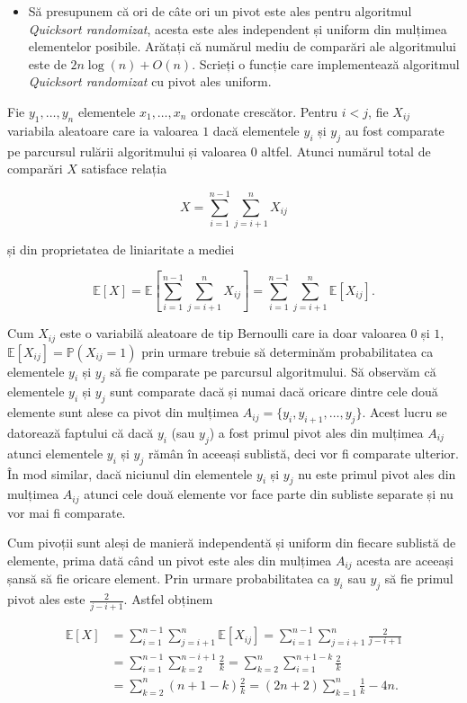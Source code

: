 \documentclass[]{article}
\newenvironment{frshaded*}{%
  \def\FrameCommand{\fboxrule=\FrameRule\fboxsep=\FrameSep \fcolorbox{framecolor}{shadecolor1}}%
  \MakeFramed {\advance\hsize-\width \FrameRestore}}%
{\endMakeFramed}
\newenvironment{rmdblock}[1]
  {\begin{frshaded*}
  \begin{itemize}
  \renewcommand{\labelitemi}{
    \raisebox{-.7\height}[0pt][0pt]{
      {\setkeys{Gin}{width=2em,keepaspectratio}\texttt{[image: images/icons/\#1]}}
    }
  }
  \item
  }
  {
  \end{itemize}
  \end{frshaded*}
  }
\newenvironment{rmdexercise}
  {\begin{rmdblock}{exercise}}
  {\end{rmdblock}}
\begin{document}
\begin{rmdexercise}
Să presupunem că ori de câte ori un pivot este ales pentru algoritmul
\emph{Quicksort randomizat}, acesta este ales independent și uniform din
mulțimea elementelor posibile. Arătați că numărul mediu de comparări ale
algoritmului este de \(2n\log(n)+O(n)\). Scrieți o funcție care
implementează algoritmul \emph{Quicksort randomizat} cu pivot ales
uniform.
\end{rmdexercise}

Fie \(y_1,\ldots, y_n\) elementele \(x_1,\ldots, x_n\) ordonate
crescător. Pentru \(i<j\), fie \(X_{ij}\) variabila aleatoare care ia
valoarea \(1\) dacă elementele \(y_i\) și \(y_j\) au fost comparate pe
parcursul rulării algoritmului și valoarea \(0\) altfel. Atunci numărul
total de comparări \(X\) satisface relația

\[
  X = \sum_{i = 1}^{n-1}\sum_{j = i+1}^{n}X_{ij}
\]

și din proprietatea de liniaritate a mediei

\[
  \mathbb{E}[X] = \mathbb{E}\left[\sum_{i = 1}^{n-1}\sum_{j = i+1}^{n}X_{ij}\right] = \sum_{i = 1}^{n-1}\sum_{j = i+1}^{n}\mathbb{E}[X_{ij}].
\]

Cum \(X_{ij}\) este o variabilă aleatoare de tip Bernoulli care ia doar
valoarea \(0\) și \(1\), \(\mathbb{E}[X_{ij}]=\mathbb{P}(X_{ij}=1)\)
prin urmare trebuie să determinăm probabilitatea ca elementele \(y_i\)
și \(y_j\) să fie comparate pe parcursul algoritmului. Să observăm că
elementele \(y_i\) și \(y_j\) sunt comparate dacă și numai dacă oricare
dintre cele două elemente sunt alese ca pivot din mulțimea
\(A_{ij} = \{y_i,y_{i+1},\ldots, y_j\}\). Acest lucru se datorează
faptului că dacă \(y_i\) (sau \(y_j\)) a fost primul pivot ales din
mulțimea \(A_{ij}\) atunci elementele \(y_i\) și \(y_j\) rămân în
aceeași sublistă, deci vor fi comparate ulterior. În mod similar, dacă
niciunul din elementele \(y_i\) și \(y_j\) nu este primul pivot ales din
mulțimea \(A_{ij}\) atunci cele două elemente vor face parte din
subliste separate și nu vor mai fi comparate.

Cum pivoții sunt aleși de manieră independentă și uniform din fiecare
sublistă de elemente, prima dată când un pivot este ales din mulțimea
\(A_{ij}\) acesta are aceeași șansă să fie oricare element. Prin urmare
probabilitatea ca \(y_i\) sau \(y_j\) să fie primul pivot ales este
\(\frac{2}{j-i+1}\). Astfel obținem

\begin{align*}
  \mathbb{E}[X] &= \sum_{i = 1}^{n-1}\sum_{j = i+1}^{n}\mathbb{E}[X_{ij}] = \sum_{i = 1}^{n-1}\sum_{j = i+1}^{n}\frac{2}{j-i+1} \\
         &= \sum_{i = 1}^{n-1}\sum_{k = 2}^{n-i+1}\frac{2}{k} = \sum_{k = 2}^{n}\sum_{i = 1}^{n+1-k}\frac{2}{k} \\
         &= \sum_{k = 2}^{n}(n+1-k)\frac{2}{k} = (2n+2)\sum_{k = 1}^{n}\frac{1}{k} - 4n.
\end{align*}
\end{document}
